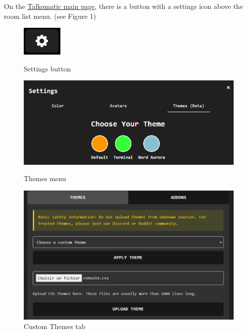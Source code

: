 \documentclass{article}
\begin{document}
On the \href{https://talkomatic.co}{Talkomatic main page}, there is a button with a settings icon above the room list menu. (see Figure 1)
\begin{figure}
    \begin{minipage}{0.3\textwidth}
        \centering
        \includegraphics[width=1\linewidth]{1.png}
        \caption{Settings button}
        \label{fig:enter-label}
    \end{minipage}\hfill
    \begin{minipage}{0.3\textwidth}
        \centering
        \includegraphics[width=1\linewidth]{2.png}
        \caption{Themes menu}
        \label{fig:enter-label}
    \end{minipage}\hfill
    \begin{minipage}{0.3\textwidth}
        \centering
        \includegraphics[width=1\linewidth]{3.png}
        \caption{Custom Themes tab}
        \label{fig:enter-label}
    \end{minipage}
\end{figure}
\end{document}
